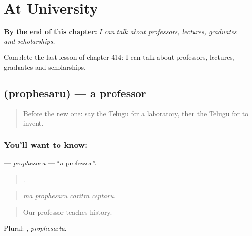 
\chapter{At University}
\label{ch:te-at-university}

\begin{chapteropening}
\textbf{By the end of this chapter:} \emph{I can talk about professors, lectures, graduates and scholarships.}

Complete the last lesson of chapter 414: I can talk about professors, lectures, graduates and scholarships.
\end{chapteropening}

\section[\texorpdfstring{\te{ప్రొఫెసరు} (prophesaru)}{ప్రొఫెసరు (prophesaru)}]{ (prophesaru) — a professor}

\label{lesson:TE-C414-prophesaru}



\begin{quote}
Before the new one: say the Telugu for a laboratory, then the Telugu for to invent.
\end{quote}

\subsection*{You'll want to know: }
\textbf{} — \emph{prophesaru} — \textquotedblleft{}a professor\textquotedblright{}.

\begin{quote}
   .
\end{quote}

\begin{quote}
\emph{mā prophesaru caritra ceptāru.}
\end{quote}

\begin{quote}
Our professor teaches history.
\end{quote}

Plural: , \emph{prophesarlu}.

